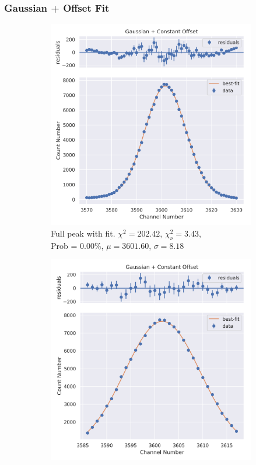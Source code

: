 \documentclass[11pt,a4paper]{article}
\begin{document}
\subsubsection{Gaussian + Offset Fit}
\begin{figure}[H]
  \centering
  \begin{subfigure}{.5\linewidth}
    \centering
    \includegraphics[width=\linewidth]{./Images/Sodium22/Gauss/Gauss_1_Full.png}
    \caption{Full peak with fit. $\chi^2 = 202.42$, $\chi^2_\nu = 3.43$, \\ Prob = 0.00\%, $\mu = 3601.60$, $\sigma = 8.18$}
  \end{subfigure}%
  \begin{subfigure}{.5\linewidth}
    \centering
    \includegraphics[width=\linewidth]{./Images/Sodium22/Gauss/Gauss_1_Zoom.png}

\end{subfigure}
\end{figure}
\end{document}
